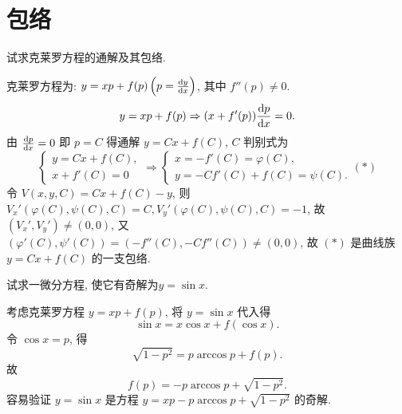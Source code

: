 \section{包络}



\begin{exercise}
  试求克莱罗方程的通解及其包络.
\end{exercise}

\begin{solve} 
  克莱罗方程为: $y=xp+f(p)\left(p=\frac{\mathop{}\!\mathrm{d} y}{\mathop{}\!\mathrm{d} x}\right)$, 其中 $f''(p)\neq0$.
  \[y=xp+f(p)\Rightarrow(x+f'(p))\frac{\mathop{}\!\mathrm{d} p}{\mathop{}\!\mathrm{d} x}=0.\]
  由 $\frac{\mathop{}\!\mathrm{d} p}{\mathop{}\!\mathrm{d} x}=0 $ 即 $p=C$ 得通解 $y=Cx+f(C)$, $C$ 判别式为
  \[\begin{cases}
      y=Cx+f(C), \\
      x+f'(C)=0
    \end{cases}\Rightarrow
    \begin{cases}
      x=-f'(C)=\varphi(C), \\
      y=-Cf'(C)+f(C)=\psi(C).
    \end{cases}(*)\]
  令 $V(x,y,C)=Cx+f(C)-y$, 则 $V_x'(\varphi(C),\psi(C),C)=C,V_y'(\varphi(C),\psi(C),C)=-1$, 
  故 $(V_x',V_y')\neq(0,0)$, 又$(\varphi'(C),\psi'(C))=(-f''(C),-Cf''(C))\neq(0,0)$, 
  故 $(*)$ 是曲线族 $y=Cx+f(C)$ 的一支包络.
\end{solve}



\begin{exercise}
  试求一微分方程, 使它有奇解为$y=\sin x$.
\end{exercise}

\begin{solve} 
  考虑克莱罗方程 $y=xp+f(p)$, 将 $y=\sin x$ 代入得
  \[\sin x=x\cos x+f(\cos x).\]
  令 $\cos x=p$, 得
  \[\sqrt{1-p^2}=p\arccos p+f(p).\]
  故
  \[f(p)=-p\arccos p+\sqrt{1-p^2}.\]
  容易验证 $y=\sin x$ 是方程 $y=xp-p\arccos p+\sqrt{1-p^2}$ 的奇解.
\end{solve}